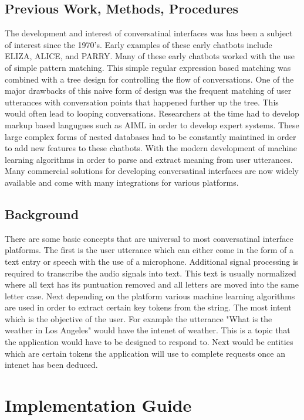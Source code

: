 \documentclass[9pt,software]{livecoms}
\begin{document}
\subsection{Previous Work, Methods, Procedures}
The development and interest of conversatinal interfaces was has been a subject of interest since the 1970's. Early examples of these
early chatbots include ELIZA, ALICE, and PARRY. Many of these early chatbots worked with the use of simple pattern matching. This simple 
regular expression based matching was combined with a tree design for controlling the flow of conversations. One of the major drawbacks of 
this naive form of design was the frequent matching of user utterances with conversation points that happened further up the tree. This 
would often lead to looping conversations. Researchers at the time had to develop markup based langugues such as AIML in order to develop 
expert systems. These large complex forms of nested databases had to be constantly maintined in order to add new features to these chatbots. 
With the modern development of machine learning algorithms in order to parse and extract meaning from user utterances. Many commercial solutions
for developing conversatinal interfaces are now widely available and come with many integrations for various platforms.
\subsection{Background}
There are some basic concepts that are universal to most conversatinal interface platforms. The first is the user utterance which can either come in 
the form of a text entry or speech with the use of a microphone. Additional signal processing is required to transcribe the audio signals into text. 
This text is usually normalized where all text has its puntuation removed and all letters are moved into the same letter case. Next depending on the 
platform various machine learning algorithms are used in order to extract certain key tokens from the string. The most intent which is the objective
of the user. For example the utterance "What is the weather in Los Angeles" would have the intenet of weather. This is a topic that the application
would have to be designed to respond to. Next would be entities which are certain tokens the application will use to complete requests once an intenet
has been deduced.

\section{Implementation Guide}
\end{document}
